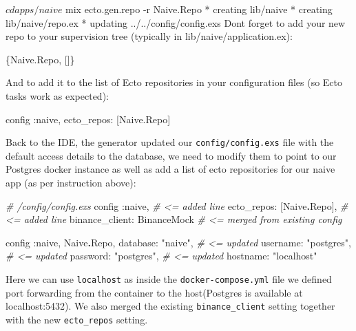 \documentclass[
  oneside]{book}
\newenvironment{Shaded}{\begin{snugshade}}{\end{snugshade}}
\newcommand{\AttributeTok}[1]{\textcolor[rgb]{0.77,0.63,0.00}{#1}}
\newcommand{\CommentTok}[1]{\textcolor[rgb]{0.56,0.35,0.01}{\textit{#1}}}
\newcommand{\ConstantTok}[1]{\textcolor[rgb]{0.00,0.00,0.00}{#1}}
\newcommand{\ExtensionTok}[1]{#1}
\newcommand{\NormalTok}[1]{#1}
\newcommand{\OperatorTok}[1]{\textcolor[rgb]{0.81,0.36,0.00}{\textbf{#1}}}
\newcommand{\StringTok}[1]{\textcolor[rgb]{0.31,0.60,0.02}{#1}}
\newcommand{\VariableTok}[1]{\textcolor[rgb]{0.00,0.00,0.00}{#1}}
\begin{document}
\begin{Shaded}
\begin{Highlighting}[]
\ExtensionTok{$}\NormalTok{ cd apps/naive}
\ExtensionTok{$}\NormalTok{ mix ecto.gen.repo }\AttributeTok{{-}r}\NormalTok{ Naive.Repo}
\ExtensionTok{*}\NormalTok{ creating lib/naive}
\ExtensionTok{*}\NormalTok{ creating lib/naive/repo.ex}
\ExtensionTok{*}\NormalTok{ updating ../../config/config.exs}
\ExtensionTok{Don}\StringTok{\textquotesingle{}t forget to add your new repo to your supervision tree}
\StringTok{(typically in lib/naive/application.ex):}

\StringTok{    \{Naive.Repo, []\}}

\StringTok{And to add it to the list of Ecto repositories in your}
\StringTok{configuration files (so Ecto tasks work as expected):}

\StringTok{    config :naive,}
\StringTok{      ecto\_repos: [Naive.Repo]}
\end{Highlighting}
\end{Shaded}

Back to the IDE, the generator updated our \texttt{config/config.exs} file with the default access details to the database, we need to modify them to point to our Postgres docker instance as well as add a list of ecto repositories for our naive app (as per instruction above):

\begin{Shaded}
\begin{Highlighting}[]
\CommentTok{\# /config/config.exs}
\NormalTok{config }\VariableTok{:naive}\NormalTok{,                }\CommentTok{\# \textless{}= added line}
  \VariableTok{ecto\_repos:}\NormalTok{ [}\ConstantTok{Naive}\OperatorTok{.}\ConstantTok{Repo}\NormalTok{],   }\CommentTok{\# \textless{}= added line}
  \VariableTok{binance\_client:} \ConstantTok{BinanceMock} \CommentTok{\# \textless{}= merged from existing config}

\NormalTok{config }\VariableTok{:naive}\NormalTok{, }\ConstantTok{Naive}\OperatorTok{.}\ConstantTok{Repo}\NormalTok{,}
  \VariableTok{database:} \StringTok{"naive"}\NormalTok{,    }\CommentTok{\# \textless{}= updated}
  \VariableTok{username:} \StringTok{"postgres"}\NormalTok{, }\CommentTok{\# \textless{}= updated}
  \VariableTok{password:} \StringTok{"postgres"}\NormalTok{, }\CommentTok{\# \textless{}= updated}
  \VariableTok{hostname:} \StringTok{"localhost"}
\end{Highlighting}
\end{Shaded}

Here we can use \texttt{localhost} as inside the \texttt{docker-compose.yml} file we defined port forwarding from the container to the host(Postgres is available at localhost:5432). We also merged the existing \texttt{binance\_client} setting together with the new \texttt{ecto\_repos} setting.
\end{document}
